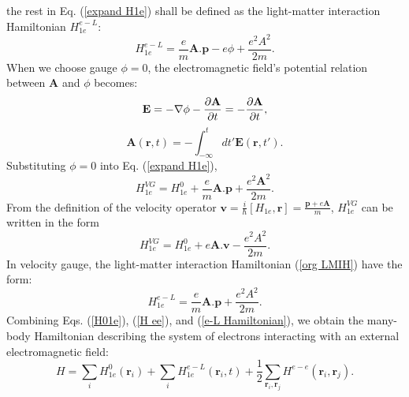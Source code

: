 \documentclass[12pt,english,a4paper]{article}
\begin{document}
the rest in Eq. (\ref{expand H1e}) shall be defined as the light-matter interaction Hamiltonian $H^{e-L}_{1e}$:
	\begin{equation}
		\label{org LMIH}
		H^{e-L}_{1e} =\frac{e}{m} \textbf{A}.\textbf{p} - e\phi + \frac{e^2 A^2}{2m}.
	\end{equation}
\quad When we choose gauge $\phi = 0$, the electromagnetic field's potential relation between $\textbf{A}$ and $\phi$ becomes:
	\begin{equation}
		\textbf{E} = - \nabla \phi - \pdv{\textbf{A}}{t} = - \pdv{\textbf{A}}{t},
	\end{equation}
	\begin{equation}
		\textbf{A}(\textbf{r},t) = -\int_{-\infty}^t dt' \textbf{E}(\textbf{r}, t'). 
	\end{equation}
\quad Substituting $\phi = 0$ into Eq. (\ref{expand H1e}),
	\begin{equation}
		H^{VG}_{1e}= H^0_{1e} + \frac{e}{m}\textbf{A}.\textbf{p} + \frac{e^2\textbf{A}^2}{2m}.
	\end{equation}
\quad From the definition of the velocity operator $\textbf{v}= \frac{i}{\hbar} [H_{1e}, \textbf{r}] = \frac{\textbf{p}+e\textbf{A}}{m}$, $H^{VG}_{1e}$ can be written in the form
	\begin{equation}
		\label{H VG}
		H^{VG}_{1e} = H^0_{1e} + e \textbf{A}.\textbf{v} - \frac{e^2A^2}{2m}.
	\end{equation}
\quad In velocity gauge, the light-matter interaction Hamiltonian (\ref{org LMIH}) have the form:
	\begin{equation}
		\label{e-L Hamiltonian}
		H^{e-L}_{1e} =\frac{e}{m} \textbf{A}.\textbf{p} + \frac{e^2 A^2}{2m}.
	\end{equation}
\quad Combining Eqs. (\ref{H01e}), (\ref{H ee}), and (\ref{e-L Hamiltonian}), we obtain the many-body Hamiltonian describing the system of electrons interacting with an external electromagnetic field:
	\begin{equation}
		\label{1st Quanti}
		H =  \sum_{i} H^0_{1e} (\textbf{r}_i) + \sum_{i} H^{e-L}_{1e} (\textbf{r}_i,t) + \frac{1}{2} \sum_{\textbf{r}_i, \textbf{r}_j}H^{e-e}(\textbf{r}_i, \textbf{r}_j).
	\end{equation}
\end{document}
